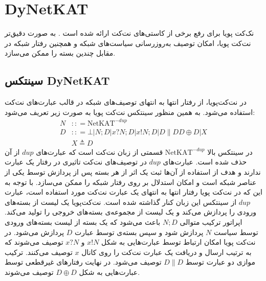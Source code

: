 \section{DyNetKAT}
نک‌کت‌ پویا برای رفع برخی از کاستی‌های نت‌کت ارائه شده است
\cite{dynetkat}.
به صورت دقیق‌تر نت‌کت پویا، امکان توصیف به‌روز‌رسانی سیاست‌های شبکه و همچنین رفتار شبکه در مقابل چندین بسته را ممکن می‌سازد.

\subsection{سینتکس DyNetKAT}
در نت‌کت‌پویا، از رفتار انتها به انتها‌ی توصیف‌های شبکه در قالب عبارت‌های نت‌کت استفاده می‌شود.
به همین منظور سینتکس نت‌کت‌ پویا به صورت زیر تعریف می‌شود:
\begin{align*}
    N & :: = \mathrm{NetKAT}^{-dup}                    \\
    D & :: = \bot | N;D | x?N;D | x!N;D | D\parallel D
    D \oplus D | X                                     \\
      & X \triangleq D
\end{align*}
در سینتکس بالا
$\mathrm{NetKAT}^{-dup}$
قسمتی از زبان نت‌کت است که عبارت‌های
$dup$
از آن حذف شده است.
عبارت‌های
$dup$
در توصیف‌های نت‌کت تاثیری در رفتار یک عبارت ندارند و هدف از استفاده از آن‌ها ثبت یک اثر از هر بسته پس از پردازش توسط یکی از عناصر شبکه است و امکان استدلال بر روی رفتار شبکه را ممکن می‌سازد.
با توجه به این که در نت‌کت پویا رفتار انتها به انتهای یک عبارت نت‌کت مورد استفاده است، عبارت
$dup$
از سینتکس این زبان کنار گذاشته شده است.
نت‌کت‌پویا یک لیست از بسته‌های ورودی را پردازش می‌کند و یک لیست از مجموعه‌ی بسته‌های خروجی را تولید می‌کند.
اپراتور ترکیب متوالی
$N;D$
باعث می‌شود که یک بسته از لیست بسته‌های ورودی توسط سیاست
$N$
پردازش شود و سپس بسته‌ی توسط عبارت
$D$
پردازش می‌شود.
در نت‌کت پویا امکان ارتباط توسط عبارت‌هایی به شکل
$x!N$
و
$x?N$
توصیف می‌شوند که به ترتیب ارسال و دریافت یک عبارت نت‌کت را روی کانال
$x$
توصیف می‌کنند.
ترکیب موازی دو عبارت توسط
$D \parallel D$
توصیف می‌شود.
در نهایت رفتار‌های غیرقطعی توسط‌ عبارت‌هایی به شکل
$D \oplus D$
توصیف می‌شوند.

